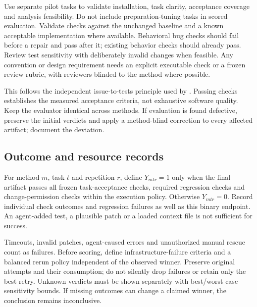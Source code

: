 Use separate pilot tasks to validate installation, task clarity, acceptance
coverage and analysis feasibility. Do not include preparation-tuning tasks in
scored evaluation. Validate checks against the unchanged baseline and a known
acceptable implementation where available. Behavioral bug checks should fail
before a repair and pass after it; existing behavior checks should already pass.
Review test sensitivity with deliberately invalid changes when feasible.
Any convention or design requirement needs an explicit executable check or a
frozen review rubric, with reviewers blinded to the method where possible.

This follows the independent issue-to-tests principle used by
\citet{jimenez2024}. Passing checks establishes the measured acceptance criteria,
not exhaustive software quality. Keep the evaluator identical across methods.
If evaluation is found defective, preserve the initial verdicts and apply a
method-blind correction to every affected artifact; document the deviation.

\subsection{Outcome and resource records}
For method $m$, task $t$ and repetition $r$, define $Y_{mtr}=1$ only when the
final artifact passes all frozen task-acceptance checks, required regression
checks and change-permission checks within the execution policy. Otherwise
$Y_{mtr}=0$. Record individual check outcomes and regression failures as well as
this binary endpoint. An agent-added test, a plausible patch or a loaded context
file is not sufficient for success.

Timeouts, invalid patches, agent-caused errors and unauthorized manual rescue
count as failures. Before scoring, define infrastructure-failure criteria and a
balanced rerun policy independent of the observed winner. Preserve original
attempts and their consumption; do not silently drop failures or retain only
the best retry. Unknown verdicts must be shown separately with best/worst-case
sensitivity bounds. If missing outcomes can change a claimed winner, the
conclusion remains inconclusive.


